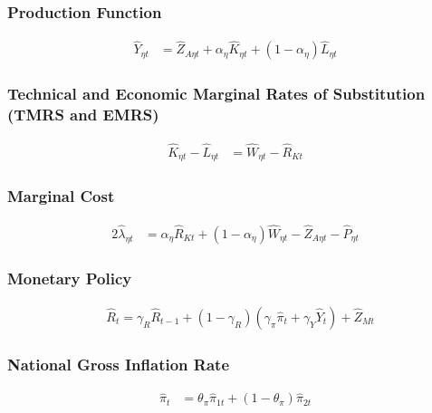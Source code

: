 \documentclass[../thesis.tex]{subfiles}
\begin{document}
\subsubsection*{Production Function}

\begin{align}
	\hat{Y}_{\eta t} &= \hat{Z}_{A\eta t} + {\alpha_{\eta}} \hat{K}_{\eta t} + (1-\alpha_{\eta}) \hat{L}_{\eta t} \label{eq_v2:reg-ll-final-goods-firm-bundle-rule-3}
\end{align}


\subsubsection*{Technical and Economic Marginal Rates of Substitution (TMRS and EMRS)}

	\begin{align}
		\hat{K}_{\eta t} - \hat{L}_{\eta t} &= \hat{W}_{\eta t} - \hat{R}_{K t} \label{eq_v2:reg-ll-int-good-firm-TMRS}
	\end{align}

\subsubsection*{Marginal Cost}

\begin{alignat}{2}
	\hat{\lambda}_{\eta t} &= {\alpha_{\eta}} \hat{R}_{Kt} + (1- {\alpha_{\eta}}) \hat{W}_{\eta t} - \hat{Z}_{A\eta t} - \hat{P}_{\eta t} \label{eq_v2:reg-ll-int-good-firm-MC-3}
\end{alignat}


\subsubsection*{Monetary Policy}

\begin{align}
	& \hat{R}_t = \gamma_{R} \hat{R}_{t-1} + (1-\gamma_{R})(\gamma_{\pi} \hat{\pi}_t + \gamma_{Y} \hat{Y}_t) + \hat{Z}_{Mt} \label{eq_v2:reg-ll-monetary-policy}
\end{align}


\subsubsection*{National Gross Inflation Rate}

\begin{align}
	\hat{\pi}_{t} &= \theta_{\pi} \hat{\pi}_{1t} + (1 - \theta_{\pi}) \hat{\pi}_{2t} \label{eq_v2:reg-gross-inflation-rate-ll}
\end{align}
\end{document}
